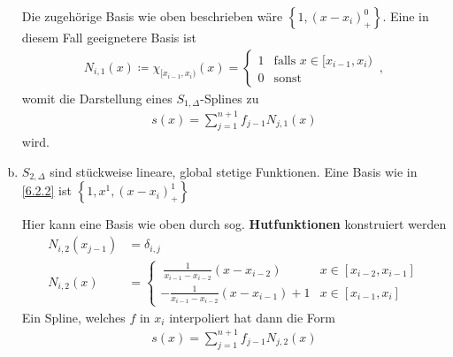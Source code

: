 \begin{Bspe}
\begin{enumerate}[a)]
    Die zugehörige Basis wie oben beschrieben wäre
    $\left\{ 1,(x-x_i)_+^0\right\}$.
    Eine in diesem Fall geeignetere Basis ist
    \begin{gather*}
      N_{i,1} (x)\coloneqq \chi_{[x_{i-1},x_i)}(x)
      = \begin{cases}
        1 & \text{falls } x\in[x_{i-1},x_i)\\
        0 & \text{sonst}
      \end{cases}\, ,
    \end{gather*}
    womit die Darstellung eines $S_{1,\Delta}$-Splines zu 
    \begin{gather*}
      s(x) = \sum_{j=1}^{n+1} f_{j-1} N_{j,1}(x)
    \end{gather*}
    wird.
  \item {} $S_{2,\Delta}$ 
    sind stückweise lineare, global stetige
    Funktionen. Eine Basis wie in \ref{6.2.2} ist
    $ \left\{1,x^1, (x-x_i)_+^1\right\}$
    \label{im6.2.4(2)}
    
    Hier kann eine Basis wie oben durch sog. 
    \textbf{Hutfunktionen}
    konstruiert werden
    \begin{align*}
      N_{i,2}(x_{j-1}) &= \delta_{i,j}\\
      N_{i,2}(x) &= \begin{cases}
        ~\frac{1}{x_{i-1}-x_{i-2}}(x-x_{i-2}) & x\in [x_{i-2}, x_{i-1}]\\
        -\frac{1}{x_{i-1}-x_{i-2}}(x-x_{i-1})+1 & x\in [x_{i-1}, x_i]
      \end{cases}
    \end{align*}
    \label{im6.2.4(3)}
    Ein Spline, welches $f$ in $x_i$ interpoliert hat dann die Form
    \begin{gather*}
      s(x) = \sum_{j=1}^{n+1}f_{j-1}N_{j,2}(x)
    \end{gather*}
  \end{enumerate}
\end{Bspe}


